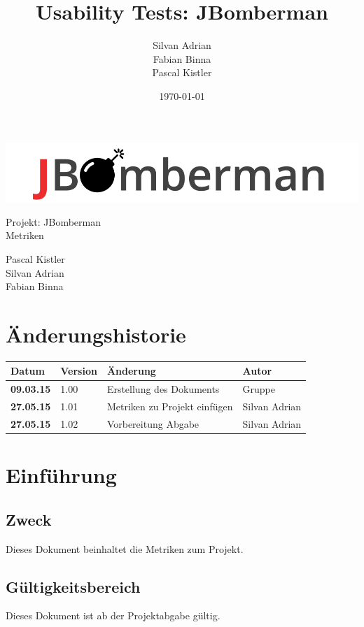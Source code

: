 \documentclass[11pt]{scrartcl}
\title{Usability Tests: JBomberman}
\author{Silvan Adrian \\ Fabian Binna \\ Pascal Kistler}
\date{\today{}}
\begin{document}
\def\arraystretch{1.5}
\begin{titlepage}
\begin{center}
\vspace{10em}
\includegraphics[scale=2]{jbomberman}
\vspace{10em}
\end{center}
\begin{center}
\huge {Projekt: JBomberman} \\
\huge {Metriken}
\end{center}
\begin{center}
\vspace{10em}
\LARGE {Pascal Kistler} \\
\LARGE {Silvan Adrian} \\
\LARGE {Fabian Binna}
\end{center}

\end{titlepage}

\newpage
\section{Änderungshistorie}
\label{sec:Änderungen}

\begin{tabularx}{\linewidth}{l l l l}
\textbf{Datum} & \textbf{Version} & \textbf{Änderung}  & \textbf{Autor} \\
\hline
\textbf{09.03.15} & 1.00 & Erstellung des Dokuments & Gruppe \\
\textbf{27.05.15} & 1.01 & Metriken zu Projekt einfügen & Silvan Adrian \\
\textbf{27.05.15} & 1.02 & Vorbereitung Abgabe & Silvan Adrian\\
\end{tabularx}

\newpage
\tableofcontents
\newpage
\section{Einführung}
\subsection{Zweck}
Dieses Dokument beinhaltet die Metriken zum Projekt.
\subsection{Gültigkeitsbereich}
Dieses Dokument ist ab der Projektabgabe gültig.
\end{document}

